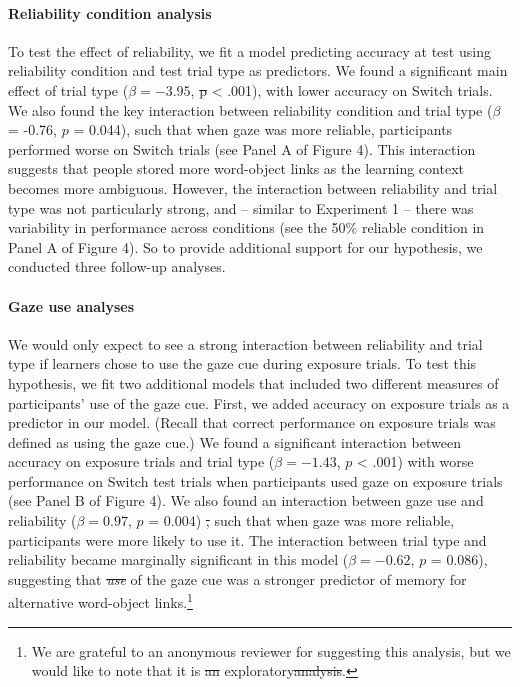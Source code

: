 \documentclass[authoryear, review]{elsarticle}
\providecommand{\DIFaddtex}[1]{{\protect\color{blue}\uwave{#1}}} %
\providecommand{\DIFdeltex}[1]{{\protect\color{red}\sout{#1}}}                      %
\providecommand{\DIFaddbegin}{} %
\providecommand{\DIFaddend}{} %
\providecommand{\DIFdelbegin}{} %
\providecommand{\DIFdelend}{} %
\providecommand{\DIFadd}[1]{\texorpdfstring{\DIFaddtex{#1}}{#1}} %
\providecommand{\DIFdel}[1]{\texorpdfstring{\DIFdeltex{#1}}{}} %
\begin{document}
\paragraph{Reliability condition
analysis}\label{reliability-condition-analysis}

To test the effect of reliability, we fit a model predicting accuracy at
test using reliability condition and test trial type as predictors. We
found a significant main effect of trial type (\(\beta = -3.95\), \DIFdelbegin \DIFdel{p
}\DIFdelend \DIFaddbegin \DIFadd{\(p\)
}\DIFaddend \textless{} .001), with lower accuracy on Switch trials. We also found
the key interaction between reliability condition and trial type
(\(\beta\) = -0.76, \(p\) = 0.044), such that when gaze was more
reliable, participants performed worse on Switch trials (see Panel A of
Figure 4). This interaction suggests that people stored more word-object
links as the learning context becomes more ambiguous. However, the
interaction between reliability and trial type was not particularly
strong, and -- similar to Experiment 1 -- there was variability in
performance across conditions (see the 50\% reliable condition in Panel
A of Figure 4). So to provide additional support for our hypothesis, we
conducted three follow-up analyses.

\paragraph{Gaze use analyses}\label{gaze-use-analyses}

We would only expect to see a strong interaction between reliability and
trial type if learners chose to use the gaze cue during exposure trials.
To test this hypothesis, we fit two additional models that included two
different measures of participants' use of the gaze cue. First, we added
accuracy on exposure trials as a predictor in our model. (Recall that
correct performance on exposure trials was defined as using the gaze
cue.) We found a significant interaction between accuracy on exposure
trials and trial type (\(\beta = -1.43\), \(p\) \textless{} .001) with
worse performance on Switch test trials when participants used gaze on
exposure trials (see Panel B of Figure 4). We also found an interaction
between gaze use and reliability (\(\beta = 0.97\), \(p\) = 0.004) \DIFdelbegin \DIFdel{, }\DIFdelend such
that when gaze was more reliable, participants were more likely to use
it. The interaction between trial type and reliability became marginally
significant in this model (\(\beta = -0.62\), \(p\) = 0.086), suggesting
that \DIFdelbegin \emph{\DIFdel{use}} %
\DIFdelend \DIFaddbegin \DIFadd{participants' use }\DIFaddend of the gaze cue was a stronger predictor of
memory for alternative word-object links.\footnote{We are grateful to an
  anonymous reviewer for suggesting this analysis, but we would like to
  note that it is \DIFdelbegin \DIFdel{an }\DIFdelend exploratory\DIFdelbegin \DIFdel{analysis}\DIFdelend .}
\end{document}
